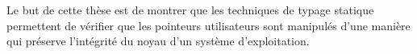 
Le but de cette thèse est de montrer que les techniques de typage statique
permettent de vérifier que les pointeurs utilisateurs sont manipulés d'une
manière qui préserve l'intégrité du noyau d'un système d'exploitation.
